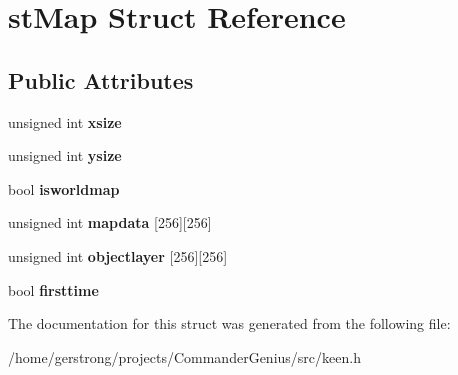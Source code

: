 \hypertarget{structst_map}{
\section{stMap Struct Reference}
\label{structst_map}
}
\subsection*{Public Attributes}
\begin{DoxyCompactItemize}
\item 
\hypertarget{structst_map_a7c2ae26f138132994f051ac876597698}{
unsigned int {\bfseries xsize}}
\label{structst_map_a7c2ae26f138132994f051ac876597698}

\item 
\hypertarget{structst_map_adc5d7c96802cf103b5c5e0517e5d63c7}{
unsigned int {\bfseries ysize}}
\label{structst_map_adc5d7c96802cf103b5c5e0517e5d63c7}

\item 
\hypertarget{structst_map_a6ca29272f2d7e2b40d5b08b67b793531}{
bool {\bfseries isworldmap}}
\label{structst_map_a6ca29272f2d7e2b40d5b08b67b793531}

\item 
\hypertarget{structst_map_a9f7809a82f4b5a63243cfded37766d33}{
unsigned int {\bfseries mapdata} \mbox{[}256\mbox{]}\mbox{[}256\mbox{]}}
\label{structst_map_a9f7809a82f4b5a63243cfded37766d33}

\item 
\hypertarget{structst_map_a75648c2b8c1139e9871447f997087995}{
unsigned int {\bfseries objectlayer} \mbox{[}256\mbox{]}\mbox{[}256\mbox{]}}
\label{structst_map_a75648c2b8c1139e9871447f997087995}

\item 
\hypertarget{structst_map_a4726507a497bd698886871c2779147d8}{
bool {\bfseries firsttime}}
\label{structst_map_a4726507a497bd698886871c2779147d8}

\end{DoxyCompactItemize}


The documentation for this struct was generated from the following file:\begin{DoxyCompactItemize}
\item 
/home/gerstrong/projects/CommanderGenius/src/keen.h\end{DoxyCompactItemize}
